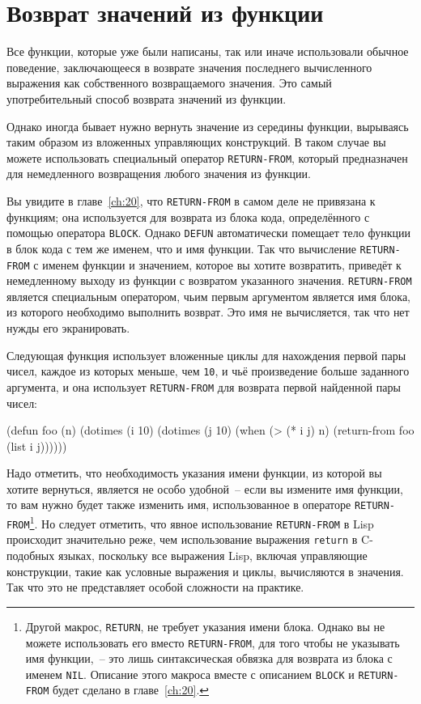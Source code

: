 \section{Возврат значений из функции}

Все функции, которые уже были написаны, так или иначе использовали обычное поведение,
заключающееся в возврате значения последнего вычисленного выражения как собственного
возвращаемого значения.  Это самый употребительный способ возврата значений из функции.

Однако иногда бывает нужно вернуть значение из середины функции, вырываясь таким образом
из вложенных управляющих конструкций.  В таком случае вы можете использовать специальный
оператор \lstinline{RETURN-FROM}, который предназначен для немедленного возвращения любого
значения из функции.

Вы увидите в главе~\ref{ch:20}, что \lstinline{RETURN-FROM} в самом деле не привязана к функциям; она
используется для возврата из блока кода, определённого с помощью оператора \lstinline{BLOCK}.
Однако \lstinline{DEFUN} автоматически помещает тело функции в блок кода с тем же именем, что и
имя функции.  Так что вычисление \lstinline{RETURN-FROM} с именем функции и значением, которое вы
хотите возвратить, приведёт к немедленному выходу из функции с возвратом указанного
значения.  \lstinline{RETURN-FROM} является специальным оператором, чьим первым аргументом
является имя блока, из которого необходимо выполнить возврат.  Это имя не вычисляется, так
что нет нужды его экранировать.

Следующая функция использует вложенные циклы для нахождения первой пары чисел, каждое из
которых меньше, чем \lstinline{10}, и чьё произведение больше заданного аргумента, и она использует
\lstinline{RETURN-FROM} для возврата первой найденной пары чисел:

\begin{myverb}
(defun foo (n)
  (dotimes (i 10)
    (dotimes (j 10)
      (when (> (* i j) n)
        (return-from foo (list i j))))))
\end{myverb}

Надо отметить, что необходимость указания имени функции, из которой вы хотите вернуться,
является не особо удобной~-- если вы измените имя функции, то вам нужно будет также
изменить имя, использованное в операторе \lstinline{RETURN-FROM}\footnote{Другой макрос,
  \lstinline{RETURN}, не требует указания имени блока.  Однако вы не можете использовать его
  вместо \lstinline{RETURN-FROM}, для того чтобы не указывать имя функции,~-- это лишь
  синтаксическая обвязка для возврата из блока с именем \lstinline{NIL}.  Описание этого
  макроса вместе с описанием \lstinline{BLOCK} и \lstinline{RETURN-FROM} будет сделано в
  главе~\ref{ch:20}.}.  Но следует отметить, что явное использование
  \lstinline{RETURN-FROM} в Lisp происходит значительно реже, чем использование
  выражения \lstinline{return} в C-подобных языках, поскольку
все выражения Lisp, включая управляющие конструкции, такие как условные выражения и циклы,
вычисляются в значения.  Так что это не представляет особой сложности на практике.

